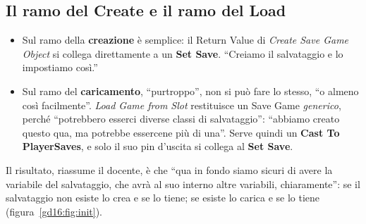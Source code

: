 \subsection{Il ramo del Create e il ramo del Load}

\begin{itemize}
  \item Sul ramo della \textbf{creazione} è semplice: il Return Value di
        \emph{Create Save Game Object} si collega direttamente a un
        \textbf{Set Save}. ``Creiamo il salvataggio e lo impostiamo così.''
  \item Sul ramo del \textbf{caricamento}, ``purtroppo'', non si può fare lo
        stesso, ``o almeno così facilmente''. \emph{Load Game from Slot}
        restituisce un Save Game \emph{generico}, perché ``potrebbero esserci
        diverse classi di salvataggio'': ``abbiamo creato questo qua, ma potrebbe
        essercene più di una''. Serve quindi un \textbf{Cast To PlayerSaves},
        e solo il suo pin d'uscita si collega al \textbf{Set Save}.
\end{itemize}
Il risultato, riassume il docente, è che ``qua in fondo siamo sicuri di avere
la variabile del salvataggio, che avrà al suo interno altre variabili,
chiaramente'': se il salvataggio non esiste lo crea e se lo tiene; se esiste lo
carica e se lo tiene (figura~\ref{gd16:fig:init}).

